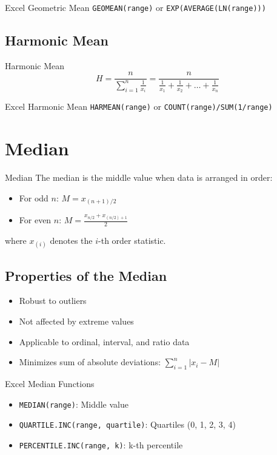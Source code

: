 \documentclass[12pt,a4paper]{book}
\begin{document}
\begin{example}{Excel Geometric Mean}
\texttt{GEOMEAN(range)} or \texttt{EXP(AVERAGE(LN(range)))}
\end{example}

\subsection{Harmonic Mean}

\begin{definition}{Harmonic Mean}
\[
H = \frac{n}{\sum_{i=1}^{n} \frac{1}{x_i}} = \frac{n}{\frac{1}{x_1} + \frac{1}{x_2} + \ldots + \frac{1}{x_n}}
\]
\end{definition}

\begin{example}{Excel Harmonic Mean}
\texttt{HARMEAN(range)} or \texttt{COUNT(range)/SUM(1/range)}
\end{example}

\section{Median}

\begin{definition}{Median}
The median is the middle value when data is arranged in order:
\begin{itemize}
    \item For odd $n$: $M = x_{(n+1)/2}$
    \item For even $n$: $M = \frac{x_{n/2} + x_{(n/2)+1}}{2}$
\end{itemize}
where $x_{(i)}$ denotes the $i$-th order statistic.
\end{definition}

\subsection{Properties of the Median}

\begin{itemize}
    \item Robust to outliers
    \item Not affected by extreme values
    \item Applicable to ordinal, interval, and ratio data
    \item Minimizes sum of absolute deviations: $\sum_{i=1}^{n} |x_i - M|$
\end{itemize}

\begin{example}{Excel Median Functions}
\begin{itemize}
    \item \texttt{MEDIAN(range)}: Middle value
    \item \texttt{QUARTILE.INC(range, quartile)}: Quartiles (0, 1, 2, 3, 4)
    \item \texttt{PERCENTILE.INC(range, k)}: k-th percentile
\end{itemize}
\end{example}
\end{document}
